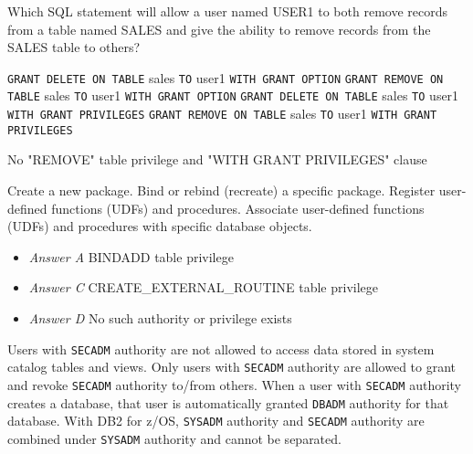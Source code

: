 \documentclass[answers, 11pt]{exam}
\begin{document}
\begin{questions}
\question[1]
Which SQL statement will allow a user named USER1 to both remove records from a table named
SALES and give the ability to remove records from the SALES table to others?
\begin{choices}
\CorrectChoice \texttt{GRANT DELETE ON TABLE} sales \texttt{TO} user1 \texttt{WITH GRANT OPTION}
\choice \texttt{GRANT REMOVE ON TABLE} sales \texttt{TO} user1 \texttt{WITH GRANT OPTION}
\choice \texttt{GRANT DELETE ON TABLE} sales \texttt{TO} user1 \texttt{WITH GRANT PRIVILEGES}
\choice \texttt{GRANT REMOVE ON TABLE} sales \texttt{TO} user1 \texttt{WITH GRANT PRIVILEGES}
\end{choices}

\begin{solution}
No "REMOVE" table privilege and "WITH GRANT PRIVILEGES" clause
\end{solution}

\begin{choices}
\choice Create a new package.
\CorrectChoice Bind or rebind (recreate) a specific package.
\choice Register user-defined functions (UDFs) and procedures.
\choice Associate user-defined functions (UDFs) and procedures with specific database objects.
\end{choices}

\begin{solution}
\begin{itemize}
\item \textit{Answer A} BINDADD table privilege
\item \textit{Answer C} CREATE\_EXTERNAL\_ROUTINE table privilege
\item \textit{Answer D} No such authority or privilege exists
\end{itemize}
\end{solution}

\begin{choices}
\choice Users with \texttt{SECADM} authority are not allowed to access data stored in system 
catalog tables and views.
\CorrectChoice Only users with \texttt{SECADM} authority are allowed to grant and revoke \texttt{SECADM}
authority to/from others.
\choice When a user with \texttt{SECADM} authority creates a database, that user is automatically granted
\texttt{DBADM} authority for that database.
\choice With DB2 for z/OS, \texttt{SYSADM} authority and \texttt{SECADM} authority are combined under
\texttt{SYSADM} authority and cannot be separated.
\end{choices}


\end{questions}
\end{document}
